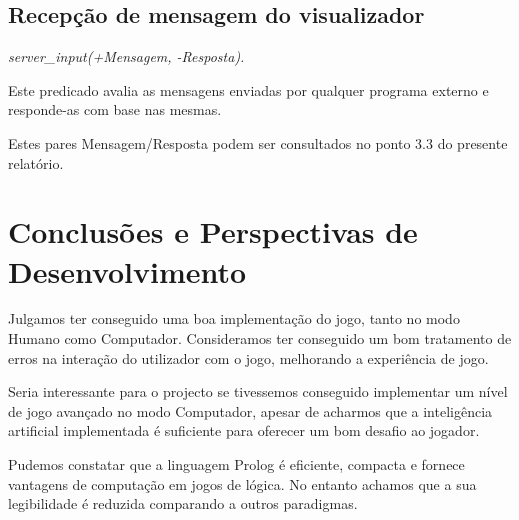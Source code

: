 \documentclass[15pt,a4paper]{article}
\begin{document}

\subsection{Recepção de mensagem do visualizador}

\textit{server\_input(+Mensagem, -Resposta).}

Este predicado avalia as mensagens enviadas por qualquer programa externo e responde-as com base nas mesmas.

Estes pares Mensagem/Resposta podem ser consultados no ponto 3.3 do presente relatório.


\newpage

\section{Conclusões e Perspectivas de Desenvolvimento}


Julgamos ter conseguido uma boa implementação do jogo, tanto no modo Humano como Computador.
Consideramos ter conseguido um bom tratamento de erros na interação do utilizador com o jogo, melhorando a experiência de jogo.

Seria interessante para o projecto se tivessemos conseguido implementar um nível de jogo avançado no modo Computador, apesar de acharmos que a inteligência artificial implementada é suficiente para oferecer um bom desafio ao jogador.

Pudemos constatar que a linguagem Prolog é eficiente, compacta e fornece vantagens de computação em jogos de lógica. No entanto achamos que a sua legibilidade é reduzida comparando a outros paradigmas.




\clearpage

\renewcommand\refname{Bibliografia}


\end{document}
